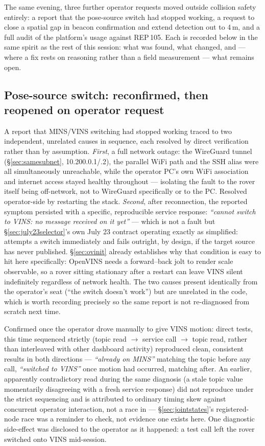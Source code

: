 The same evening, three further operator requests moved outside collision
safety entirely: a report that the pose-source switch had stopped working, a
request to close a spatial gap in beacon confirmation and extend detection
out to 4\,m, and a full audit of the platform's  usage against
REP\,105. Each is recorded below in the same spirit as the rest of this
session: what was found, what changed, and — where a fix rests on reasoning
rather than a field measurement — what remains open.

\subsection{Pose-source switch: reconfirmed, then reopened on operator
request}
\label{sec:july24switch}
A report that MINS/VINS switching had stopped working traced to two
independent, unrelated causes in sequence, each resolved by direct
verification rather than by assumption. \emph{First}, a full network outage:
the WireGuard tunnel (\S\ref{sec:samesubnet}, 10.200.0.1/.2), the parallel
WiFi path and the  SSH alias were all simultaneously
unreachable, while the operator PC's own WiFi association and internet
access stayed healthy throughout — isolating the fault to the rover itself
being off-network, not to WireGuard specifically or to the PC. Resolved
operator-side by restarting the stack. \emph{Second}, after reconnection,
the reported symptom persisted with a specific, reproducible service
response: \emph{``cannot switch to VINS: no message received on it
yet''} — which is not a fault but \S\ref{sec:july23selector}'s own July 23
contract operating exactly as simplified:  attempts a
switch immediately and fails outright, by design, if the target source has
never published. \S\ref{sec:ovinit} already establishes why that condition
is easy to hit here specifically: OpenVINS needs a forward--back jolt to
render scale observable, so a rover sitting stationary after a restart can
leave VINS silent indefinitely regardless of network health. The two causes
present identically from the operator's seat (``the switch doesn't work'')
but are unrelated in the code, which is worth recording precisely so the
same report is not re-diagnosed from scratch next time.

Confirmed once the operator drove manually to give VINS motion: direct
 tests, this time sequenced strictly (topic read
$\to$ service call $\to$ topic read, rather than interleaved with other
dashboard activity) reproduced clean, consistent results in both
directions — \emph{``already on MINS''} matching the topic before any
call, \emph{``switched to VINS''} once motion had occurred, matching after.
An earlier, apparently contradictory read during the same diagnosis
(a stale topic value momentarily disagreeing with a fresh service response)
did not reproduce under the strict sequencing and is attributed to ordinary
timing skew against concurrent operator interaction, not a race in
 — \S\ref{sec:jointstates}'s registered-node race
was a reminder to check, not evidence one exists here. One diagnostic
side-effect was disclosed to the operator as it happened: a test call left
the rover switched onto VINS mid-session.

